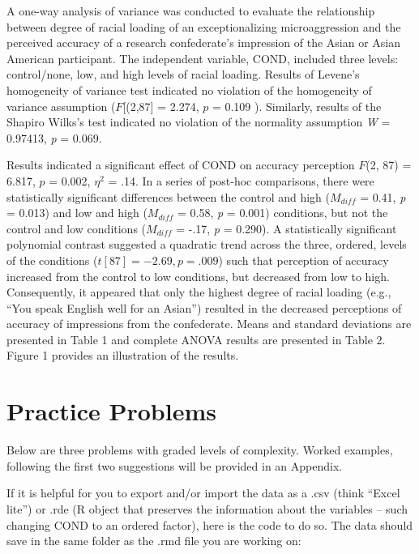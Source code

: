 \documentclass[
  english,
]{book}
\begin{document}
A one-way analysis of variance was conducted to evaluate the relationship between degree of racial loading of an exceptionalizing microaggression and the perceived accuracy of a research confederate's impression of the Asian or Asian American participant. The independent variable, COND, included three levels: control/none, low, and high levels of racial loading. Results of Levene's homogeneity of variance test indicated no violation of the homogeneity of variance assumption (\(F\){[}(2,87{]} = 2.274, \(p\) = 0.109 ). Similarly, results of the Shapiro Wilks's test indicated no violation of the normality assumption \emph{W} = 0.97413, \emph{p} = 0.069.

Results indicated a significant effect of COND on accuracy perception \(F\)(2, 87) = 6.817, \(p\) = 0.002, \(\eta^2\) = .14. In a series of post-hoc comparisons, there were statistically significant differences between the control and high (\(M_{diff}\) = 0.41, \emph{p} = 0.013) and low and high (\(M_{diff}\) = 0.58, \emph{p} = 0.001) conditions, but not the control and low conditions (\(M_{diff}\) = -.17, \emph{p} = 0.290). A statistically significant polynomial contrast suggested a quadratic trend across the three, ordered, levels of the conditions (\(t[87] = -2.69, p = .009\)) such that perception of accuracy increased from the control to low conditions, but decreased from low to high. Consequently, it appeared that only the highest degree of racial loading (e.g., ``You speak English well for an Asian'') resulted in the decreased perceptions of accuracy of impressions from the confederate. Means and standard deviations are presented in Table 1 and complete ANOVA results are presented in Table 2. Figure 1 provides an illustration of the results.

\hypertarget{practice-problems-1}{%
\section{Practice Problems}\label{practice-problems-1}}

Below are three problems with graded levels of complexity. Worked examples, following the first two suggestions will be provided in an Appendix.

If it is helpful for you to export and/or import the data as a .csv (think ``Excel lite'') or .rde (R object that preserves the information about the variables -- such changing COND to an ordered factor), here is the code to do so. The data should save in the same folder as the .rmd file you are working on:
\end{document}
